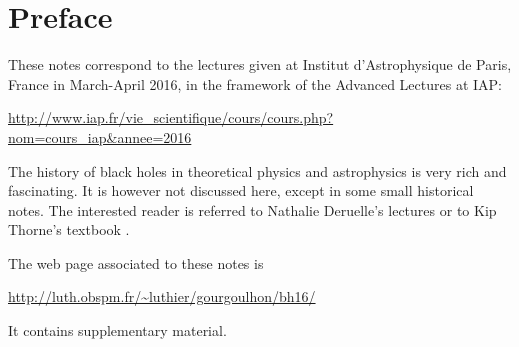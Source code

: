 \chapter*{Preface}

These notes correspond to the lectures given at
Institut d'Astrophysique de Paris, France in March-April 2016, in the
framework of the Advanced Lectures at IAP:

\centerline{\url{http://www.iap.fr/vie_scientifique/cours/cours.php?nom=cours_iap&annee=2016}}

\vspace{2ex}

The history of black holes in theoretical physics and astrophysics is
very rich and fascinating. It is however not discussed here, except in some
small historical notes. The interested
reader is referred to Nathalie Deruelle's lectures \cite{Derue09} or to Kip Thorne's
textbook \cite{Thorn94}.


The web page associated to these notes is

\centerline{\url{http://luth.obspm.fr/~luthier/gourgoulhon/bh16/}}

It contains supplementary material.
